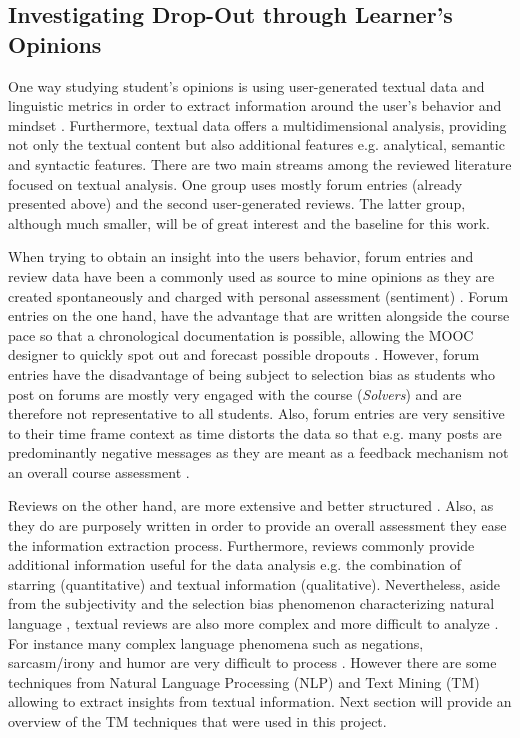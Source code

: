 \documentclass[
	a4paper,
	pdftex,
	12pt,	
	footinclude=true,
	fleqn,
	final,
	]{report}%
\begin{document}
\vspace{-0.45cm}
\subsection[Investigating Learner's Opinions]{Investigating Drop-Out through Learner's Opinions}
\vspace{-0.3cm}

One way studying student's opinions is using user-generated textual data and linguistic metrics
in order to extract information around the user's behavior and mindset \cite{Mehl2006,Fang2015}.
Furthermore, textual data offers a multidimensional analysis\cite{Liu2010}, 
providing not only the textual content but also additional features e.g. 
analytical, semantic and syntactic features. There are two main streams 
among the reviewed literature focused on textual analysis. One group
uses mostly forum entries (already presented above) and the second user-generated reviews. 
The latter group, although much smaller, will be of great interest and the baseline for this work.

When trying to obtain an insight into the users behavior, forum entries 
and review data have been a commonly used as source to mine opinions \cite{Fang2015,Pang2002,Pang2008,Rose2014,Adamopoulos2013}
as they are created spontaneously and charged with personal assessment (sentiment) \cite{Liu2012}. 
Forum entries on the one hand, have the advantage that are written alongside
the course pace \cite{Rose2014} so that a chronological documentation is possible, 
allowing the MOOC designer to quickly spot out and forecast possible dropouts \cite{Wen2014}. 
However, forum entries have the disadvantage of being subject to selection bias 
as students who post on forums are mostly very engaged with the course (\emph{Solvers}) \cite{Anderson2014} 
and are therefore not representative \cite{Wen2014a} to all students. Also, forum entries are very sensitive 
to their time frame context as time distorts the data so that e.g. many posts are predominantly 
negative messages as they are meant as a feedback mechanism not an overall course assessment \cite{Wen2014}. 

Reviews on the other hand, are more extensive and better structured \cite{Liu2012}. Also,
as they do are purposely written in order to provide an overall assessment \cite{Devi2012} 
they ease the information extraction process\cite{Pang2002}. Furthermore, reviews commonly provide 
additional information useful for the data analysis e.g. the combination of starring (quantitative) 
and textual information (qualitative)\cite{Liu2012}. Nevertheless, aside from the subjectivity 
and the selection bias phenomenon characterizing natural language \cite{Liu2012}, 
textual reviews are also more complex and more difficult to analyze \cite{Pang2002}. 
For instance many complex language phenomena such as negations, sarcasm/irony and humor 
are very difficult to process \cite{Pang2008}. However there are some techniques
from Natural Language Processing (NLP) and Text Mining (TM) allowing to extract insights from textual information. 
Next section will provide an overview of the TM techniques that were used in this project.
\end{document}

